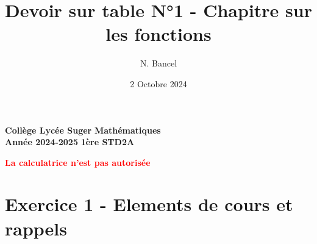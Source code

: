 \documentclass{exam}
\title{Devoir sur table N°1 - Chapitre sur les fonctions}
\author{N. Bancel}
\date{2 Octobre 2024}
\begin{document}
\textbf{Collège Lycée Suger}
\hfill
\textbf{Mathématiques} \\

\textbf{Année 2024-2025}
\hfill
\textbf{1ère STD2A} \par

{\let\newpage\relax\maketitle}

\begin{center}
\textbf{\textcolor{red}{La calculatrice n'est pas autorisée}}
\end{center}

\section*{Exercice 1 - Elements de cours et rappels}
\end{document}
